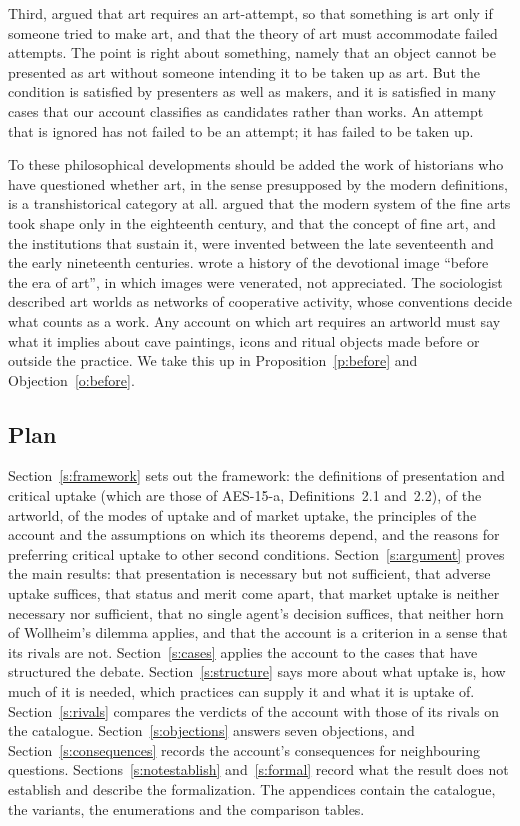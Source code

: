 \documentclass{situationist-preprint}
\begin{document}
Third, \citet{MagUidhir2013} argued that art requires an art-attempt, so that something is art only if someone tried to make art, and that the theory of art must accommodate failed attempts. The point is right about something, namely that an object cannot be presented as art without someone intending it to be taken up as art. But the condition is satisfied by presenters as well as makers, and it is satisfied in many cases that our account classifies as candidates rather than works. An attempt that is ignored has not failed to be an attempt; it has failed to be taken up.

To these philosophical developments should be added the work of historians who have questioned whether art, in the sense presupposed by the modern definitions, is a transhistorical category at all. \citet{Kristeller1951} argued that the modern system of the fine arts took shape only in the eighteenth century, and \citet{Shiner2001} that the concept of fine art, and the institutions that sustain it, were invented between the late seventeenth and the early nineteenth centuries. \citet{Belting1994} wrote a history of the devotional image \enquote{before the era of art}, in which images were venerated, not appreciated. The sociologist \citet{Becker1982} described art worlds as networks of cooperative activity, whose conventions decide what counts as a work. Any account on which art requires an artworld must say what it implies about cave paintings, icons and ritual objects made before or outside the practice. We take this up in Proposition~\ref{p:before} and Objection~\ref{o:before}.

\subsection{Plan}

Section~\ref{s:framework} sets out the framework: the definitions of presentation and critical uptake (which are those of AES-15-a, Definitions~2.1 and~2.2), of the artworld, of the modes of uptake and of market uptake, the principles of the account and the assumptions on which its theorems depend, and the reasons for preferring critical uptake to other second conditions. Section~\ref{s:argument} proves the main results: that presentation is necessary but not sufficient, that adverse uptake suffices, that status and merit come apart, that market uptake is neither necessary nor sufficient, that no single agent's decision suffices, that neither horn of Wollheim's dilemma applies, and that the account is a criterion in a sense that its rivals are not. Section~\ref{s:cases} applies the account to the cases that have structured the debate. Section~\ref{s:structure} says more about what uptake is, how much of it is needed, which practices can supply it and what it is uptake of. Section~\ref{s:rivals} compares the verdicts of the account with those of its rivals on the catalogue. Section~\ref{s:objections} answers seven objections, and Section~\ref{s:consequences} records the account's consequences for neighbouring questions. Sections~\ref{s:notestablish} and~\ref{s:formal} record what the result does not establish and describe the formalization. The appendices contain the catalogue, the variants, the enumerations and the comparison tables.
\end{document}
